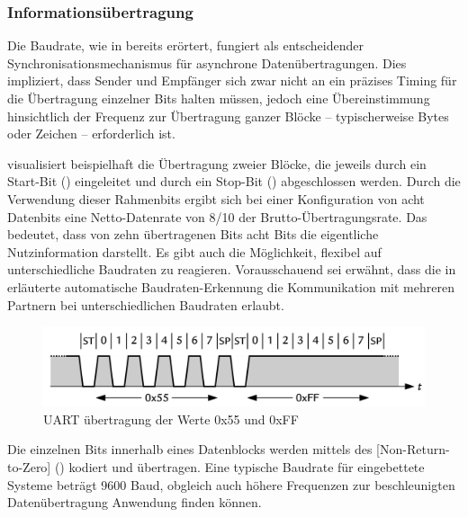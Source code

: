 \subsubsection{Informations\"ubertragung}
\label{sec:UART_uebertragung}

Die Baudrate, wie in  bereits er\"ortert, fungiert als entscheidender Synchronisationsmechanismus f\"ur asynchrone Daten\"ubertragungen. Dies impliziert, dass Sender und Empf\"anger sich zwar nicht an ein pr\"azises Timing f\"ur die \"Ubertragung einzelner Bits halten m\"ussen, jedoch eine \"Ubereinstimmung hinsichtlich der Frequenz zur \"Ubertragung ganzer Bl\"ocke -- typischerweise Bytes oder Zeichen -- erforderlich ist. 

\newpage
{} visualisiert beispielhaft die \"Ubertragung zweier Bl\"ocke, die jeweils durch ein Start-Bit () eingeleitet und durch ein Stop-Bit () abgeschlossen werden. Durch die Verwendung dieser Rahmenbits ergibt sich bei einer Konfiguration von acht Datenbits eine Netto-Datenrate von 8/10 der Brutto-\"Ubertragungsrate. Das bedeutet, dass von zehn \"ubertragenen Bits acht Bits die eigentliche Nutzinformation darstellt. Es gibt auch die M\"oglichkeit, flexibel auf unterschiedliche Baudraten zu reagieren. Vorausschauend sei erw\"ahnt, dass die in  erl\"auterte automatische Baudraten-Erkennung die Kommunikation mit mehreren Partnern bei unterschiedlichen Baudraten erlaubt. 

\begin{figure}[h!]
	\centering
	\includegraphics[width=1.0\textwidth]{../Bilder/Baudrate.png}
	\caption{UART \"ubertragung der Werte 0x55 und 0xFF\\}
	\label{fig:uart_send}
\end{figure}

Die einzelnen Bits innerhalb eines Datenblocks werden mittels des [Non-Return-to-Zero] () kodiert und \"ubertragen. Eine typische Baudrate f\"ur eingebettete Systeme betr\"agt 9600 Baud, obgleich auch h\"ohere Frequenzen zur beschleunigten Daten\"ubertragung Anwendung finden k\"onnen. 

